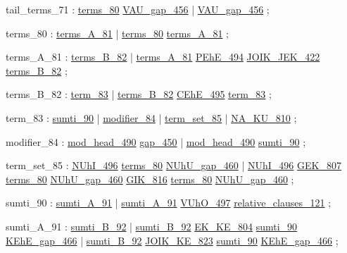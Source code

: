 \label{html:y71}
tail_terms_71           :  \hyperref[html:y80]{terms_80}  \hyperref[html:y456]{VAU_gap_456}
                        |  \hyperref[html:y456]{VAU_gap_456}
                        ;

\label{html:y80}
terms_80                :  \hyperref[html:y81]{terms_A_81}
                        |  \hyperref[html:y80]{terms_80}  \hyperref[html:y81]{terms_A_81}
                        ;

\label{html:y81}
terms_A_81              :  \hyperref[html:y82]{terms_B_82}
                        |  \hyperref[html:y81]{terms_A_81}  \hyperref[html:y494]{PEhE_494}  \hyperref[html:y422]{JOIK_JEK_422}  \hyperref[html:y82]{terms_B_82}
                        ;

\label{html:y82}
terms_B_82              :  \hyperref[html:y83]{term_83}
                        |  \hyperref[html:y82]{terms_B_82}  \hyperref[html:y495]{CEhE_495}  \hyperref[html:y83]{term_83}
                        ;

\label{html:y83}
term_83                 :  \hyperref[html:y90]{sumti_90}
                        |  \hyperref[html:y84]{modifier_84}
                        |  \hyperref[html:y85]{term_set_85}
                        |  \hyperref[html:y810]{NA_KU_810}
                        ;

\label{html:y84}
modifier_84             :  \hyperref[html:y490]{mod_head_490}  \hyperref[html:y450]{gap_450}
                        |  \hyperref[html:y490]{mod_head_490}  \hyperref[html:y90]{sumti_90}
                        ;

\label{html:y85}
term_set_85             :  \hyperref[html:y496]{NUhI_496}  \hyperref[html:y80]{terms_80}  \hyperref[html:y460]{NUhU_gap_460}
                        |  \hyperref[html:y496]{NUhI_496}  \hyperref[html:y807]{GEK_807}  \hyperref[html:y80]{terms_80}  \hyperref[html:y460]{NUhU_gap_460}
                                \hyperref[html:y816]{GIK_816}  \hyperref[html:y80]{terms_80}  \hyperref[html:y460]{NUhU_gap_460}
                        ;

\label{html:y90}
sumti_90                :  \hyperref[html:y91]{sumti_A_91}
                        |  \hyperref[html:y91]{sumti_A_91}  \hyperref[html:y497]{VUhO_497}  \hyperref[html:y121]{relative_clauses_121}
                        ;

\label{html:y91}
sumti_A_91              :  \hyperref[html:y92]{sumti_B_92}
                        |  \hyperref[html:y92]{sumti_B_92}  \hyperref[html:y804]{EK_KE_804}  \hyperref[html:y90]{sumti_90}  \hyperref[html:y466]{KEhE_gap_466}
                        |  \hyperref[html:y92]{sumti_B_92}  \hyperref[html:y823]{JOIK_KE_823}  \hyperref[html:y90]{sumti_90}  \hyperref[html:y466]{KEhE_gap_466}
                        ;

